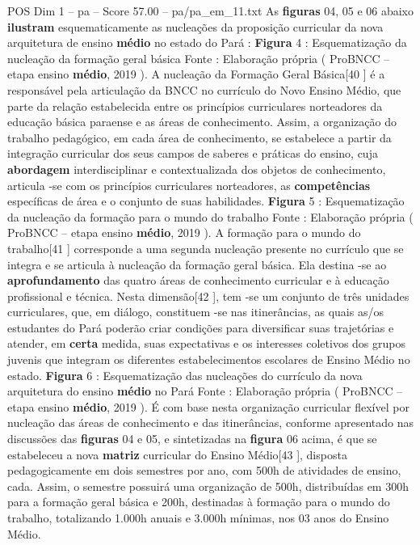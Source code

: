 \begin{textsample}{POS Dim 1 – pa – Score 57.00 – pa/pa\_em\_11.txt}
As \textbf{figuras} 04, 05 e 06 abaixo \textbf{ilustram} esquematicamente as nucleações da proposição curricular da nova arquitetura de ensino \textbf{médio} no estado do Pará : \textbf{Figura} 4 : Esquematização da nucleação da formação geral básica Fonte : Elaboração própria ( ProBNCC – etapa ensino \textbf{médio}, 2019 ).
A nucleação da Formação Geral Básica[40 ] é a responsável pela articulação da BNCC no currículo do Novo Ensino Médio, que parte da relação estabelecida entre os princípios curriculares norteadores da educação básica paraense e as áreas de conhecimento.
Assim, a organização do trabalho pedagógico, em cada área de conhecimento, se estabelece a partir da integração curricular dos seus campos de saberes e práticas do ensino, cuja \textbf{abordagem} interdisciplinar e contextualizada dos objetos de conhecimento, articula -se com os princípios curriculares norteadores, as \textbf{competências} específicas de área e o conjunto de suas habilidades. \textbf{Figura} 5 : Esquematização da nucleação da formação para o mundo do trabalho Fonte : Elaboração própria ( ProBNCC – etapa ensino \textbf{médio}, 2019 ).
A formação para o mundo do trabalho[41 ] corresponde a uma segunda nucleação presente no currículo que se integra e se articula à nucleação da formação geral básica.
Ela destina -se ao \textbf{aprofundamento} das quatro áreas de conhecimento curricular e à educação profissional e técnica.
Nesta dimensão[42 ], tem -se um conjunto de três unidades curriculares, que, em diálogo, constituem -se nas itinerâncias, as quais as/os estudantes do Pará poderão criar condições para diversificar suas trajetórias e atender, em \textbf{certa} medida, suas expectativas e os interesses coletivos dos grupos juvenis que integram os diferentes estabelecimentos escolares de Ensino Médio no estado. \textbf{Figura} 6 : Esquematização das nucleações do currículo da nova arquitetura do ensino \textbf{médio} no Pará Fonte : Elaboração própria ( ProBNCC – etapa ensino \textbf{médio}, 2019 ).
É com base nesta organização curricular flexível por nucleação das áreas de conhecimento e das itinerâncias, conforme apresentado nas discussões das \textbf{figuras} 04 e 05, e sintetizadas na \textbf{figura} 06 acima, é que se estabeleceu a nova \textbf{matriz} curricular do Ensino Médio[43 ], disposta pedagogicamente em dois semestres por ano, com 500h de atividades de ensino, cada.
Assim, o semestre possuirá uma organização de 500h, distribuídas em 300h para a formação geral básica e 200h, destinadas à formação para o mundo do trabalho, totalizando 1.000h anuais e 3.000h mínimas, nos 03 anos do Ensino Médio.

\end{textsample}
